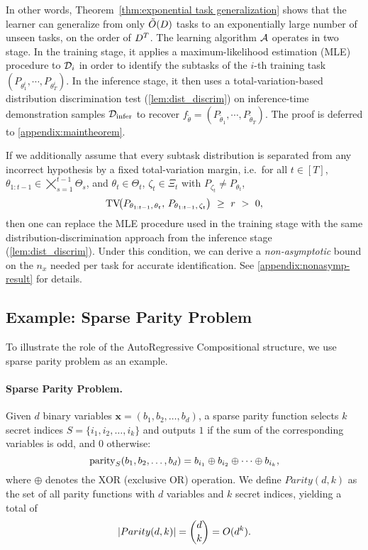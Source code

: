 In other words, Theorem~\ref{thm:exponential task generalization} shows that the learner can generalize from only $\tilde{O}(D)$ tasks  to an exponentially large number of unseen tasks, on the order of $D^T$. The learning algorithm ${\mathcal{A}}$ operates in two stage. In the training stage, it applies a maximum-likelihood estimation (MLE) procedure to ${\mathcal{D}}_i$ in order to identify the subtasks of the $i$-th training task $(P_{\theta^i_1},\cdots,P_{\theta^i_T})$. In the inference stage, it then uses a total-variation-based distribution discrimination test (\cref{lem:dist_discrim}) on inference-time demonstration samples ${\mathcal{D}}_{\mathrm{infer}}$ to recover $f_{\tilde \theta} = (P_{\tilde \theta_1},\cdots,P_{\tilde \theta_T})$. The proof is deferred to \cref{appendix:maintheorem}.






\begin{remark}
If we additionally assume that every subtask distribution is separated from any incorrect hypothesis by a fixed total-variation margin, i.e.\ for all 
$t \in [T]$, 
$\theta_{1:t-1} \in \bigtimes_{s=1}^{t-1}\Theta_s$, and 
$\theta_t \in \Theta_t$, $\zeta_t \in \Xi_t$ with $P_{\zeta_t}\neq P_{\theta_t}$,
\[
{\mathrm{TV}}\!\bigl(
  P_{\theta_{1:t-1}, \,\theta_t},\, 
  P_{\theta_{1:t-1}, \,\zeta_t}
\bigr) 
~\ge~ 
r ~>~ 0,
\]
then one can replace the MLE procedure used in the training stage with the same distribution-discrimination approach from the inference stage (\cref{lem:dist_discrim}). Under this condition, we can derive a \textit{non-asymptotic} bound on the \(n_x\) needed per task for accurate identification. See \cref{appendix:nonasymp-result} for details.
\end{remark}





\subsection{Example: Sparse Parity Problem}\label{sec: example: parity}\label{subsec:parity_exmaple}



To illustrate the role of the AutoRegressive Compositional structure, we use sparse parity problem as an example.
\paragraph{Sparse Parity Problem.} Given \( d \) binary variables \( \bm x = (b_1, b_2, \dots, b_d)  \), a sparse parity function selects \( k \) secret indices \( S = \{ i_1, i_2, \dots, i_k\} \) and outputs \( 1 \) if the sum of the corresponding variables is odd, and \( 0 \) otherwise:
\[
\mathrm{parity}_S(b_1, b_2, \dots, b_d) = b_{i_1} \oplus b_{i_2} \oplus \dots \oplus b_{i_k},
\]
where \( \oplus \) denotes the XOR (exclusive OR) operation. We define \( Parity(d, k) \) as the set of all parity functions with \( d \) variables and \( k \) secret indices, yielding a total of  
\[
|Parity(d,k)| = \binom{d}{k} = O(d^k).
\vspace{-3mm}
\]



